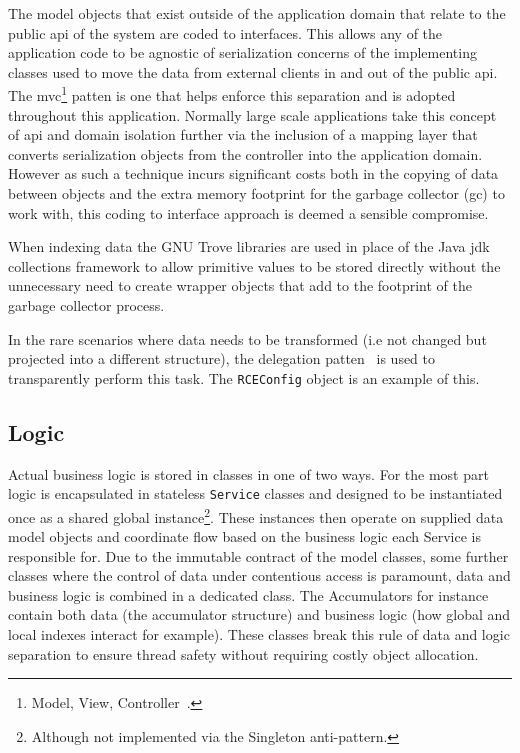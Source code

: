 \documentclass[a4paper,11pt]{scrreprt}
\begin{document}
The model objects that exist outside of the application domain that relate to the public \acrshort{api} of the system are coded to interfaces. This allows any of the application code to be agnostic of serialization concerns of the implementing classes used to move the data from external clients in and out of the public \acrshort{api}. The \acrshort{mvc}\footnote{Model, View, Controller~\cite{mvc}.} patten is one that helps enforce this separation and is adopted throughout this application. Normally large scale applications take this concept of \acrshort{api} and domain isolation further via the inclusion of a mapping layer that converts serialization objects from the controller into the application domain. However as such a technique incurs significant costs both in the copying of data between objects and the extra memory footprint for the garbage collector (\acrshort{gc}) to work with, this coding to interface approach is deemed a sensible compromise. 

When indexing data the GNU Trove libraries are used in place of the Java \acrshort{jdk} collections framework to allow primitive values to be stored directly without the unnecessary need to create wrapper objects that add to the footprint of the garbage collector process.

In the rare scenarios where data needs to be transformed (i.e not changed but projected into a different structure), the delegation patten~\cite{design-patterns} is used to transparently perform this task. The \verb|RCEConfig| object is an example of this.
\subsection{Logic}
Actual business logic is stored in classes in one of two ways. For the most part logic is encapsulated in stateless \verb|Service| classes and designed to be instantiated once as a shared global instance\footnote{Although not implemented via the Singleton anti-pattern.}. These instances then operate on supplied data model objects and coordinate flow based on the business logic each Service is responsible for. Due to the immutable contract of the model classes, some further classes where the control of data under contentious access is paramount, data and business logic is combined in a dedicated class. The Accumulators for instance contain both data (the accumulator structure) and business logic (how global and local indexes interact for example). These classes break this rule of data and logic separation to ensure thread safety without requiring costly object allocation. 
\end{document}
